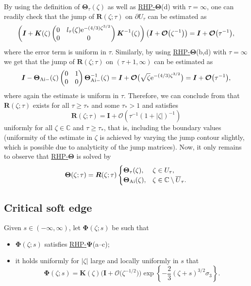 \documentclass[pdftex]{sigma}
\numberwithin{equation}{section}
\newcommand{\C}		{\mathbb{C}}
\newcommand{\rhpsi} {\textnormal{RHP}-${\boldsymbol \Psi}$}
\newcommand{\rhth} {\textnormal{RHP}-${\boldsymbol \Theta}$}
\begin{document}
By using the definition of $ \boldsymbol\Theta_\tau(\zeta) $ as well as \hyperref[rhth]{\rhth}(d) with $ \tau=\infty $, one can readily check that the jump of $ \boldsymbol R(\zeta;\tau) $ on $ \partial U_\tau $ can be estimated as
\[
\left(\boldsymbol I + \boldsymbol K(\zeta) \begin{pmatrix} 0 & l_\tau(\zeta){\rm e}^{-(4/3)\zeta^{3/2}} \\ 0 & 0 \end{pmatrix} \boldsymbol K^{-1}(\zeta) \right) \bigl( \boldsymbol I + \boldsymbol{\mathcal O}\bigl(\zeta^{-1}\bigr) \bigr) = \boldsymbol I + \boldsymbol{\mathcal O}\bigl(\tau^{-1}\bigr),
\]
where the error term is uniform in $ \tau $. Similarly, by using \hyperref[rhth]{\rhth}(b,d) with $ \tau=\infty $ we get that the jump of $ \boldsymbol R(\zeta;\tau) $ on $ (\tau+1,\infty) $ can be estimated as
\[
\boldsymbol I - \boldsymbol\Theta_{{\rm Ai}-}(\zeta) \begin{pmatrix} 0 & 1 \\ 0 & 0 \end{pmatrix} \boldsymbol\Theta_{{\rm Ai}-}^{-1}(\zeta) = \boldsymbol I + \boldsymbol{\mathcal O}\bigl(\sqrt\zeta {\rm e}^{-(4/3)\zeta^{3/2}} \bigr) = \boldsymbol I + \boldsymbol{\mathcal O}\bigl(\tau^{-1}\bigr),
\]
where again the estimate is uniform in $ \tau $. Therefore, we can conclude from \cite[Theorem~8.1]{FokasItsKapaevNovokshenov} that $ \boldsymbol R(\zeta;\tau) $ exists for all $ \tau\geq\tau_* $ and some $ \tau_*>1 $ and satisfies
\[
\boldsymbol R(\zeta;\tau) = \boldsymbol I + \boldsymbol{\mathcal O}\left( \tau^{-1}(1+|\zeta|)^{-1}\right)
\]
uniformly for all $ \zeta\in \C $ and $ \tau\geq\tau_* $, that is, including the boundary values (uniformity of the estimate in $ \zeta $ is achieved by varying the jump contour slightly, which is possible due to analyticity of the jump matrices). Now, it only remains to observe that \hyperref[rhth]{\rhth} is solved by
\[
\boldsymbol \Theta(\zeta;\tau) = \boldsymbol R(\zeta;\tau)
\begin{cases}
\boldsymbol\Theta_\tau(\zeta), & \zeta\in U_\tau, \\
\boldsymbol\Theta_{\rm Ai}(\zeta), & \zeta\in\C\setminus\overline U_\tau.
\end{cases}
\]

\subsection{Critical soft edge}


Given $ s\in(-\infty,\infty) $, let $\boldsymbol\Phi(\zeta;s)$ be such that
\begin{itemize}\itemsep=0pt\setlength{\leftskip}{0.1cm}
\label{rhphi}
\item[(a--c)] $\boldsymbol\Phi(\zeta;s)$ satisfies \hyperref[rhpsi]{\rhpsi}(a--c);
\item[(d)] it holds uniformly for $ |\zeta| $ large and locally uniformly in $ s $ that
\[
\boldsymbol\Phi(\zeta;s) = \boldsymbol K(\zeta) \bigl(\boldsymbol I + \boldsymbol{\mathcal O}\bigl(\zeta^{-1/2}\bigl) \bigl) \exp\left\{-\frac23(\zeta+s)^{3/2}\sigma_3\right\}.
\]
\end{itemize}
\end{document}
